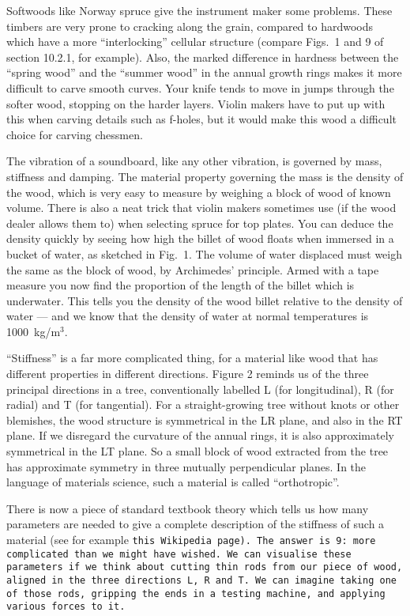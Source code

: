   Softwoods like Norway spruce give the instrument maker some problems. These 
  timbers are very prone to cracking along the grain, compared to hardwoods 
  which have a more “interlocking” cellular structure (compare Figs.\ 1 and 9 
  of section 10.2.1, for example). Also, the marked difference in hardness 
  between the “spring wood” and the “summer wood” in the annual growth rings 
  makes it more difficult to carve smooth curves. Your knife tends to move in 
  jumps through the softer wood, stopping on the harder layers. Violin makers 
  have to put up with this when carving details such as f-holes, but it would 
  make this wood a difficult choice for carving chessmen. 

  The vibration of a soundboard, like any other vibration, is governed by mass, 
  stiffness and damping. The material property governing the mass is the 
  density of the wood, which is very easy to measure by weighing a block of 
  wood of known volume. There is also a neat trick that violin makers sometimes 
  use (if the wood dealer allows them to) when selecting spruce for top plates. 
  You can deduce the density quickly by seeing how high the billet of wood 
  floats when immersed in a bucket of water, as sketched in Fig.\ 1. The volume 
  of water displaced must weigh the same as the block of wood, by Archimedes’ 
  principle. Armed with a tape measure you now find the proportion of the 
  length of the billet which is underwater. This tells you the density of the 
  wood billet relative to the density of water --- and we know that the density 
  of water at normal temperatures is 1000~kg/m$^3$. 

  “Stiffness” is a far more complicated thing, for a material like wood that 
  has different properties in different directions. Figure 2 reminds us of the 
  three principal directions in a tree, conventionally labelled L (for 
  longitudinal), R (for radial) and T (for tangential). For a straight-growing 
  tree without knots or other blemishes, the wood structure is symmetrical in 
  the LR plane, and also in the RT plane. If we disregard the curvature of the 
  annual rings, it is also approximately symmetrical in the LT plane. So a 
  small block of wood extracted from the tree has approximate symmetry in three 
  mutually perpendicular planes. In the language of materials science, such a 
  material is called “orthotropic”. 

  There is now a piece of standard textbook theory which tells us how many 
  parameters are needed to give a complete description of the stiffness of such 
  a material (see for example \tt{}this Wikipedia page\rm{}). The answer is 9: 
  more complicated than we might have wished. We can visualise these parameters 
  if we think about cutting thin rods from our piece of wood, aligned in the 
  three directions L, R and T. We can imagine taking one of those rods, 
  gripping the ends in a testing machine, and applying various forces to it. 

